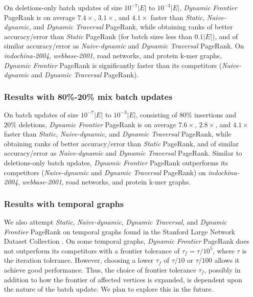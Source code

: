 On deletions-only batch updates of size $10^{-7}|E|$ to $10^{-3}|E|$, \textit{Dynamic Frontier} PageRank is on average $7.4\times$, $3.1\times$, and $4.1\times$ faster than \textit{Static}, \textit{Naive-dynamic}, and \textit{Dynamic Traversal} PageRank, while obtaining ranks of better accuracy/error than \textit{Static} PageRank (for batch sizes less than $0.1|E|$), and of similar accuracy/error as \textit{Naive-dynamic} and \textit{Dynamic Traversal} PageRank. On \textit{indochina-2004}, \textit{webbase-2001}, road networks, and protein k-mer graphs, \textit{Dynamic Frontier} PageRank is significantly faster than its competitors (\textit{Naive-dynamic} and \textit{Dynamic Traversal} PageRank).


\subsubsection{Results with 80\%-20\% mix batch updates}

On batch updates of size $10^{-7}|E|$ to $10^{-3}|E|$, consisting of $80\%$ insertions and $20\%$ deletions, \textit{Dynamic Frontier} PageRank is on average $7.6\times$, $2.8\times$, and $4.1\times$ faster than \textit{Static}, \textit{Naive-dynamic}, and \textit{Dynamic Traversal} PageRank, while obtaining ranks of better accuracy/error than \textit{Static} PageRank, and of similar accuracy/error as \textit{Naive-dynamic} and \textit{Dynamic Traversal} PageRank. Similar to deletions-only batch updates, \textit{Dynamic Frontier} PageRank outperforms its competitors (\textit{Naive-dynamic} and \textit{Dynamic Traversal} PageRank) on \textit{indochina-2004}, \textit{webbase-2001}, road networks, and protein k-mer graphs.


\subsubsection{Results with temporal graphs}

We also attempt \textit{Static}, \textit{Naive-dynamic}, \textit{Dynamic Traversal}, and \textit{Dynamic Frontier} PageRank on temporal graphs found in the Stanford Large Network Dataset Collection \cite{snap14}. On some temporal graphs, \textit{Dynamic Frontier} PageRank does not outperform its competitors with a frontier tolerance of $\tau_f = \tau / 10^5$, where $\tau$ is the iteration tolerance. However, choosing a lower $\tau_f$ of $\tau / 10$ or $\tau / 100$ allows it achieve good performance. Thus, the choice of frontier tolerance $\tau_f$, possibly in addition to how the frontier of affected vertices is expanded, is dependent upon the nature of the batch update. We plan to explore this in the future.



